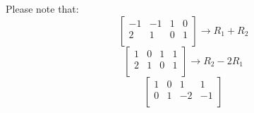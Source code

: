 \documentclass[14pt]{extarticle}
\begin{document}
\bigskip Please note that:
\[
    \left[
    \begin{array}{cc|cc}
        -1 & -1 & 1 & 0 \\
        2 & 1 & 0 & 1 \\
    \end{array}
    \right] \to R_1 + R_2
\]
\[
    \left[
    \begin{array}{cc|cc}
        1 & 0 & 1 & 1 \\
        2 & 1 & 0 & 1 \\
    \end{array}
    \right] \to R_2 - 2R_1
\]
\[
    \left[
    \begin{array}{cc|cc}
        1 & 0 & 1 & 1 \\
        0 & 1 & -2 & -1 \\
    \end{array}
    \right]
\]
\end{document}
